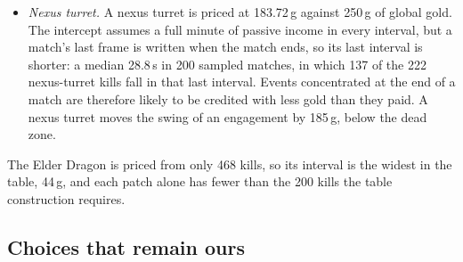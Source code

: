 \begin{itemize}
\item \emph{Nexus turret.} A nexus turret is priced at 183.72\,g against 250\,g of global gold. The
  intercept assumes a full minute of passive income in every interval, but a match's last frame is
  written when the match ends, so its last interval is shorter: a median 28.8\,s in 200 sampled matches,
  in which 137 of the 222 nexus-turret kills fall in that last interval. Events concentrated at the end
  of a match are therefore likely to be credited with less gold than they paid. A nexus turret moves the swing of an
  engagement by 185\,g, below the dead zone.
\end{itemize}
The Elder Dragon is priced from only 468 kills, so its interval is the widest in the table, 44\,g, and
each patch alone has fewer than the 200 kills the table construction requires.

\subsection{Choices that remain ours}\label{sec:label-choices}

